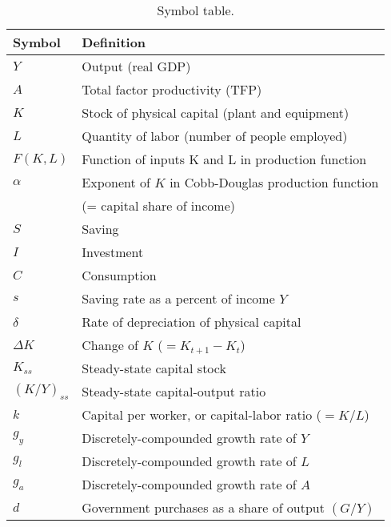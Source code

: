 \begin{table}[H]
\centering
\caption{Symbol table.}
\begin{tabular*}{0.95\textwidth}{l@{\extracolsep{\fill}}l}
\toprule
Symbol & Definition\\
\midrule
$Y$                            &Output (real GDP)\\
$A$                            &Total factor productivity (TFP)\\
$K$                            &Stock of physical capital  (plant and equipment)\\
$L$                            &Quantity of labor (number of people employed)\\
$F(K,L)$                    &Function of inputs K and L in production function\\
$\alpha$                     &Exponent of $K$ in Cobb-Douglas   production function \\
                            &(= capital share of income)\\
$S$                            &Saving\\
$I$                            &Investment\\
$C$                            &Consumption\\
$s$                         &    Saving rate as a percent of income $Y$\\
$\delta$                     &Rate of depreciation of physical capital \\
$\Delta K$                    &Change of $K$ ($=K_{t+1}-K_{t}$)\\
$K_{ss}$                    &Steady-state capital stock\\
$(K/Y)_{ss}$                &Steady-state capital-output ratio\\
$k$                         &Capital per worker, or capital-labor ratio ($=K/L$)\\
$g_y$                     &Discretely-compounded growth rate of $Y$\\
$g_l$                     &Discretely-compounded growth rate of $L$\\
$g_a$                     &Discretely-compounded growth rate of $A$\\
$d$                         &Government purchases as a share of output $(G/Y)$\\
\bottomrule
\end{tabular*}
\end{table}

